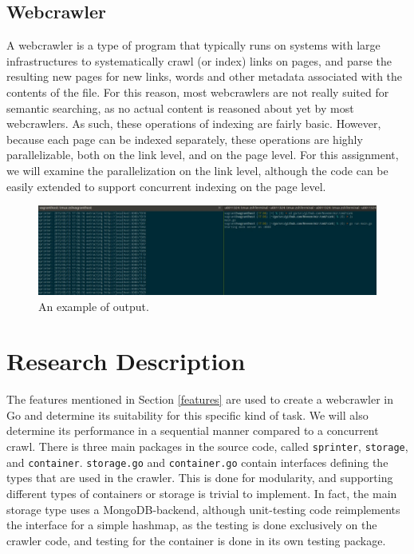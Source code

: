 \documentclass[]{article}
\begin{document}
\subsection{Webcrawler}\label{webcrawler}

A webcrawler is a type of program that typically runs on systems with
large infrastructures to systematically crawl (or index) links on pages,
and parse the resulting new pages for new links, words and other
metadata associated with the contents of the file. For this reason, most
webcrawlers are not really suited for semantic searching, as no actual
content is reasoned about yet by most webcrawlers. As such, these
operations of indexing are fairly basic. However, because each page can
be indexed separately, these operations are highly parallelizable, both
on the link level, and on the page level. For this assignment, we will
examine the parallelization on the link level, although the code can be
easily extended to support concurrent indexing on the page level.

\begin{figure}
\centering
\includegraphics[]{img/screen.jpg}
\caption{An example of output.}\label{figexample}
\end{figure}

\section{Research Description}\label{research-description}

The features mentioned in Section \ref{features} are used to create a
webcrawler in Go and determine its suitability for this specific kind of
task. We will also determine its performance in a sequential manner
compared to a concurrent crawl. There is three main packages in the
source code, called \texttt{sprinter}, \texttt{storage}, and
\texttt{container}. \texttt{storage.go} and \texttt{container.go}
contain interfaces defining the types that are used in the crawler. This
is done for modularity, and supporting different types of containers or
storage is trivial to implement. In fact, the main storage type uses a
MongoDB-backend, although unit-testing code reimplements the interface
for a simple hashmap, as the testing is done exclusively on the crawler
code, and testing for the container is done in its own testing package.
\end{document}
